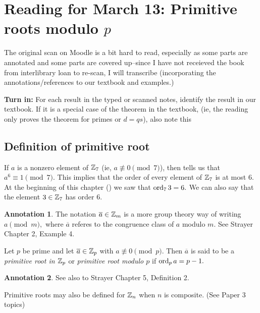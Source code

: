 \documentclass[letterpaper, 11 pt]{ximera}
\theoremstyle{definition}
\newtheorem*{annotation}{Annotation}
\begin{document}
\section{Reading for March 13: Primitive roots modulo $p$}
\setcounter{example}{0}
The original scan on Moodle is a bit hard to read, especially as some parts are annotated and some parts are covered up--since I have not receieved the book from interlibrary loan to re-scan, I will transcribe (incorporating the annotations/references to our textbook and examples.)

\noindent\textbf{Turn in:} For each result in the typed or scanned notes, identify the result in our textbook. If it is a special case of the theorem in the textbook, (ie, the reading only proves the theorem for primes or $d=qs$), also note this

\subsection*{Definition of primitive root}
If $a$ is a nonzero element of $\mathbb Z_7$ (ie, $a\not\equiv 0\pmod{7}$), then  tells us that $a^6\equiv 1\pmod{7}.$ This implies that the order of every element of $\mathbb Z_7$ is at most $6$. At the beginning of this chapter () we saw that $\operatorname{ord}_7 3=6.$ We can also say that the element $3\in\mathbb Z_7$ has order $6.$


\begin{annotation}
    The notation $\overline{a}\in\mathbb Z_m$ is a more group theory way of writing $a\pmod{m},$ where $\overline{a}$ referes to the congruence class of $a$ modulo $m.$ See Strayer Chapter 2, Example 4.
\end{annotation}

\begin{definition}[Definition 10.3.1]
    Let $p$ be prime and let $\overline{a}\in \mathbb Z_p$ with $a\not\equiv 0\pmod{p}.$ Then $\overline{a}$ is said to be a \emph{primitive root in $\mathbb Z_p$} or \emph{primitive root modulo $p$} if $\operatorname{ord}_p a=p-1.$
\end{definition}

\begin{annotation}
    See also to Strayer Chapter 5, Definition 2.
\end{annotation}

\begin{remark}
    Primitive roots may also be defined for $\mathbb Z_n$ when $n$ is composite. (See Paper 3 topics)
\end{remark}
\end{document}
